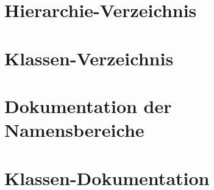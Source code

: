 \documentclass[twoside]{book}
\newcommand{\+}{\discretionary{\mbox{\scriptsize$\hookleftarrow$}}{}{}}
\begin{document}
\chapter{Hierarchie-\/\+Verzeichnis}

\chapter{Klassen-\/\+Verzeichnis}

\chapter{Dokumentation der Namensbereiche}




\chapter{Klassen-\/\+Dokumentation}

















































\end{document}
